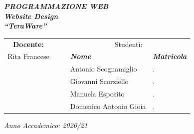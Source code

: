 \documentclass{article}
\newcommand{\insertTitle}{Website Design}
\begin{document}
\newpage
\begin{center} 
    \fontsize{28}{0} \textit{\textbf{PROGRAMMAZIONE WEB}}
    \\[2cm]
    \fontsize{28}{0} \textit{\textbf{\insertTitle}}
    \\[2cm]
    \fontsize{36}{0} \textit{\textbf{“TeraWare”}}
    \\[5cm]
    \begin{table}[h]
        \centering
        \begin{tabular}{lllll}
        \multicolumn{1}{c}{\huge\textbf{Docente:}} &  &  & \multicolumn{2}{c}{\huge Studenti:} \\
        \multicolumn{1}{c}{\large Rita Francese}     &  &  & \textit{\large \textbf{Nome}} & \textit{\large\textbf{Matricola}} \\
                          &  &  & \large Antonio Scognamiglio   & \large . \\
                          &  &  & \large Giovanni Scorziello & \large . \\
                          & & & \large Manuela Esposito & \large . \\
                          & & & \large Domenico Antonio Gioia & . \large 
        \end{tabular}
    \end{table}
\end{center}
\newpage
\begin{center}
    \fontsize{28}{0} \textit{Anno Accademico: 2020/21}
\end{center}
\end{document}
